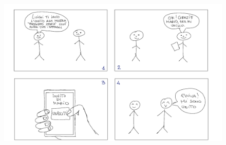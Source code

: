 \begin{figure}[h]
    \centering
    \includegraphics[width=1.0\textwidth]{images/storyboards/Storyboard-4-unione-gruppo-notitle.png}
\end{figure}
